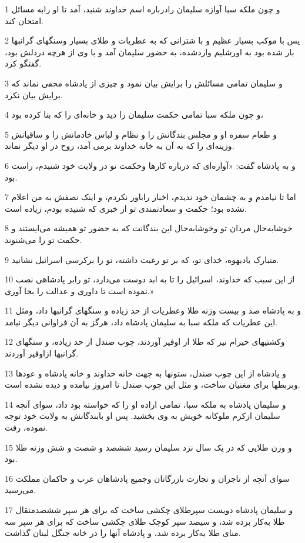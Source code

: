 \par 1 و چون ملکه سبا آوازه سلیمان رادرباره اسم خداوند شنید، آمد تا او رابه مسائل امتحان کند.
\par 2 پس با موکب بسیار عظیم و با شترانی که به عطریات و طلای بسیار وسنگهای گرانبها بار شده بود به اورشلیم واردشده، به حضور سلیمان آمد و با وی از هر‌چه دردلش بود، گفتگو کرد.
\par 3 و سلیمان تمامی مسائلش را برایش بیان نمود و چیزی از پادشاه مخفی نماند که برایش بیان نکرد.
\par 4 و چون ملکه سبا تمامی حکمت سلیمان را دید و خانه‌ای را که بنا کرده بود،
\par 5 و طعام سفره او و مجلس بندگانش را و نظام و لباس خادمانش را و ساقیانش وزینه‌ای را که به آن به خانه خداوند برمی آمد، روح در او دیگر نماند.
\par 6 و به پادشاه گفت: «آوازه‌ای که درباره کارها وحکمت تو در ولایت خود شنیدم، راست بود.
\par 7 اما تا نیامدم و به چشمان خود ندیدم، اخبار راباور نکردم، و اینک نصفش به من اعلام نشده بود؛ حکمت و سعادتمندی تو از خبری که شنیده بودم، زیاده است.
\par 8 خوشابه‌حال مردان تو وخوشابه‌حال این بندگانت که به حضور تو همیشه می‌ایستند و حکمت تو را می‌شنوند.
\par 9 متبارک بادیهوه، خدای تو، که بر تو رغبت داشته، تو را برکرسی اسرائیل نشانید.
\par 10 از این سبب که خداوند، اسرائیل را تا به ابد دوست می‌دارد، تو رابر پادشاهی نصب نموده است تا داوری و عدالت را بجا آوری.»
\par 11 و به پادشاه صد و بیست وزنه طلا وعطریات از حد زیاده و سنگهای گرانبها داد، ومثل این عطریات که ملکه سبا به سلیمان پادشاه داد، هرگز به آن فراوانی دیگر نیامد.
\par 12 وکشتیهای حیرام نیز که طلا از اوفیر آوردند، چوب صندل از حد زیاده، و سنگهای گرانبها ازاوفیر آوردند.
\par 13 و پادشاه از این چوب صندل، ستونها به جهت خانه خداوند و خانه پادشاه و عودها وبربطها برای مغنیان ساخت، و مثل این چوب صندل تا امروز نیامده و دیده نشده است.
\par 14 و سلیمان پادشاه به ملکه سبا، تمامی اراده او را که خواسته بود داد، سوای آنچه سلیمان ازکرم ملوکانه خویش به وی بخشید. پس او بابندگانش به ولایت خود توجه نموده، رفت.
\par 15 و وزن طلایی که در یک سال نزد سلیمان رسید ششصد و شصت و شش وزنه طلا بود.
\par 16 سوای آنچه از تاجران و تجارت بازرگانان وجمیع پادشاهان عرب و حاکمان مملکت می‌رسید.
\par 17 و سلیمان پادشاه دویست سپرطلای چکشی ساخت که برای هر سپر ششصدمثقال طلا به‌کار برده شد، و سیصد سپر کوچک طلای چکشی ساخت که برای هر سپر سه منای طلا به‌کار برده شد، و پادشاه آنها را در خانه جنگل لبنان گذاشت.
